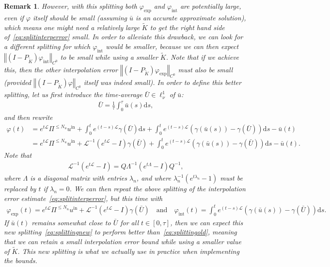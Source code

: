 \documentclass[10pt,a4paper]{article}
\theoremstyle{plain}
\newtheorem{remark}[theorem]{Remark}
\renewcommand{\L}{\mathcal{L}}
\newcommand{\bu}{\bar{u}}
\newcommand{\bU}{\bar{U}}
\newcommand{\1}{\mathbf{1}}
\newcommand{\uin}{{u^{\mathrm{in}}}}
\newcommand{\Nu}{N_{u}}
\newcommand{\Nin}{\Nu}
\begin{document}
\begin{remark}
However, with this splitting both $\varphi_{\mathrm{exp}}$ and $\varphi_{\mathrm{int}}$ are potentially large, even if $\varphi$ itself should be small (assuming $\bu$ is an accurate approximate solution), which means one might need a relatively large $\tilde{K}$ to get the right hand side of~\eqref{eq:splitinterperror} small. In order to alleviate this drawback, we can look for a different splitting for which $\varphi_{\mathrm{int}}$ would be smaller, because we can then expect $\left\Vert (I-P_{\tilde K})\varphi_{\mathrm{int}} \right\Vert_{C^0}$ to be small while using a smaller $\tilde{K}$. Note that if we achieve this, then the other interpolation error $\left\Vert (I-P_{\tilde K})\varphi_{\mathrm{exp}} \right\Vert_{C^0}$ must also be small (provided $\left\Vert (I-P_{\tilde K})\varphi \right\Vert_{C^0}$ itself was indeed small). In order to define this better splitting, let us first introduce the time-average $\bU \in\ell^1_\nu$ of $\bu$:
\begin{align*}
\bU = \frac{1}{\tau}\int_0^\tau \bu(s) \mbox{d} s,
\end{align*}
and then rewrite 
\begin{align*}
\varphi(t) &= e^{ t \L} \Pi^{\leq \Nin}\uin +  \int_{0}^{t} e^{(t-s)\L } 
		\gamma(\bU) \mbox{d} s + \int_{0}^{t} e^{(t-s)\L } \left(\gamma(\bu(s))
		-\gamma(\bU)\right) \mbox{d} s - \bu \left( t \right) \\
		&= e^{ t \L} \Pi^{\leq \Nin}\uin + \L^{-1}\left(e^{t\L}-I\right)\gamma(\bU) + \int_{0}^{t} e^{(t-s)\L } \left(\gamma(\bu(s))
		-\gamma(\bU)\right) \mbox{d} s - \bu \left( t \right).
\end{align*}
Note that
\begin{align*}
\L^{-1}\left(e^{t\L}-I\right) = Q \Lambda^{-1}\left(e^{t\Lambda}-I\right)Q^{-1},
\end{align*}
where $\Lambda$ is a diagonal matrix with entries $\lambda_n$, and where $\lambda_n^{-1}\left(e^{t\lambda_n}-1\right)$ must be replaced by $t$ if $\lambda_n=0$. We can then repeat the above splitting of the interpolation error estimate~\eqref{eq:splitinterperror}, but this time with
\begin{align}
\label{eq:splittingnew}
\varphi_{\mathrm{exp}}(t) =   e^{ t \L} \Pi^{\leq \Nin}\uin + \L^{-1}\left(e^{t\L}-I\right)\gamma(\bU) \quad\text{and}\quad \varphi_{\mathrm{int}}(t) = \int_{0}^{t} e^{(t-s)\L } 
		\left(\gamma(\bu(s))
		-\gamma(\bU)\right) \mbox{d} s.
\end{align}
If $\bu(t)$ remains somewhat close to $\bU$ for all $t\in[0,\tau]$, then we can expect this new splitting~\eqref{eq:splittingnew} to perform better than~\eqref{eq:splittingold}, meaning that we can retain a small interpolation error bound while using a smaller value of $\tilde{K}$. This new splitting is what we actually use in practice when implementing the bounds.
\end{remark}
\end{document}
